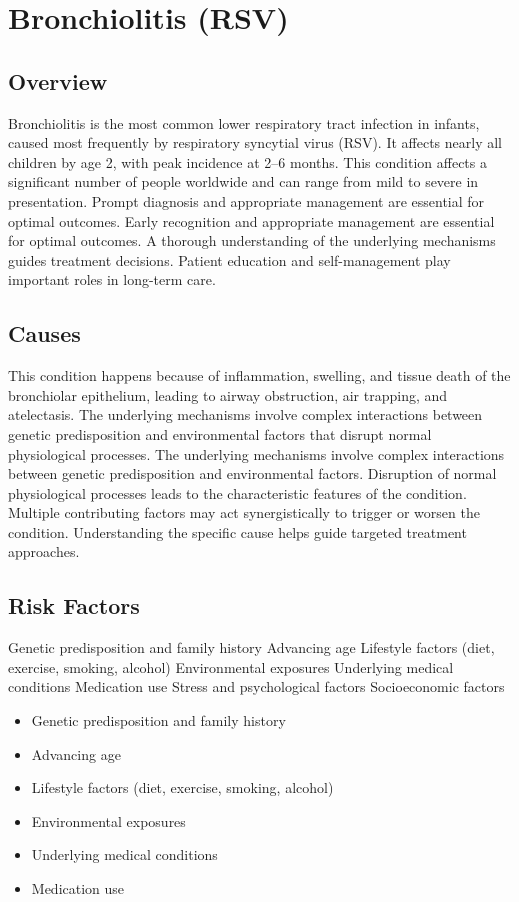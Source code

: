 \chapter{Bronchiolitis (RSV)}
\label{sec:Bronchiolitis}

\section{Overview}
Bronchiolitis is the most common lower respiratory tract infection in infants, caused most frequently by respiratory syncytial virus (RSV). It affects nearly all children by age 2, with peak incidence at 2--6 months. This condition affects a significant number of people worldwide and can range from mild to severe in presentation. Prompt diagnosis and appropriate management are essential for optimal outcomes. Early recognition and appropriate management are essential for optimal outcomes. A thorough understanding of the underlying mechanisms guides treatment decisions. Patient education and self-management play important roles in long-term care.
\section{Causes}
This condition happens because of inflammation, swelling, and tissue death of the bronchiolar epithelium, leading to airway obstruction, air trapping, and atelectasis. The underlying mechanisms involve complex interactions between genetic predisposition and environmental factors that disrupt normal physiological processes. The underlying mechanisms involve complex interactions between genetic predisposition and environmental factors. Disruption of normal physiological processes leads to the characteristic features of the condition. Multiple contributing factors may act synergistically to trigger or worsen the condition. Understanding the specific cause helps guide targeted treatment approaches.
\section{Risk Factors}
Genetic predisposition and family history Advancing age Lifestyle factors (diet, exercise, smoking, alcohol) Environmental exposures Underlying medical conditions Medication use Stress and psychological factors Socioeconomic factors

\begin{itemize}[noitemsep]
  \item Genetic predisposition and family history
  \item Advancing age
  \item Lifestyle factors (diet, exercise, smoking, alcohol)
  \item Environmental exposures
  \item Underlying medical conditions
  \item Medication use
\end{itemize}
